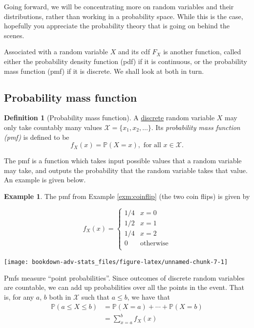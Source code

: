 \documentclass[
]{book}
\newcommand{\bbP}{\mathbb{P}}
\newcommand{\cX}{{\mathcal X}}
\theoremstyle{definition}
\newtheorem{definition}{Definition}[chapter]
\theoremstyle{definition}
\newtheorem{example}{Example}[chapter]
\theoremstyle{definition}
\theoremstyle{definition}
\theoremstyle{remark}
\begin{document}
Going forward, we will be concentrating more on random variables and their distributions, rather than working in a probability space.
While this is the case, hopefully you appreciate the probability theory that is going on behind the scenes.

Associated with a random variable \(X\) and its cdf \(F_X\) is another function, called either the probability density function (pdf) if it is continuous, or the probability mass function (pmf) if it is discrete.
We shall look at both in turn.

\hypertarget{probability-mass-function}{%
\subsection{Probability mass function}\label{probability-mass-function}}

\begin{definition}[Probability mass function]
A \uline{discrete} random variable \(X\) may only take countably many values \(\cX = \{x_1, x_2,\dots \}\).
Its \emph{probability mass function (pmf)} is defined to be
\[
f_X(x) = \bbP(X=x), \text{ for all } x \in \cX.
\]
\end{definition}

The pmf is a function which takes input possible values that a random variable may take, and outputs the probability that the random variable takes that value.
An example is given below.

\begin{example}

The pmf from Example \ref{exm:coinflip} (the two coin flips) is given by

\[
f_X(x) = \begin{cases}
1/4&x=0 \\
1/2&x=1 \\
1/4& x=2\\
0 &\text{otherwise}\\
\end{cases}
\]

\begin{center}\texttt{[image: bookdown-adv-stats\_files/figure-latex/unnamed-chunk-7-1]} \end{center}

\end{example}

Pmfs measure ``point probabilities''. Since outcomes of discrete random variables are countable, we can add up probabilities over all the points in the event.
That is, for any \(a\), \(b\) both in \(\cX\) such that \(a \leq b\), we have that
\begin{align*}
\bbP(a \leq X \leq b) 
&= \bbP(X=a) + \cdots + \bbP(X=b) \\
&= \sum_{x=a}^b f_X(x) 
\end{align*}
\end{document}
